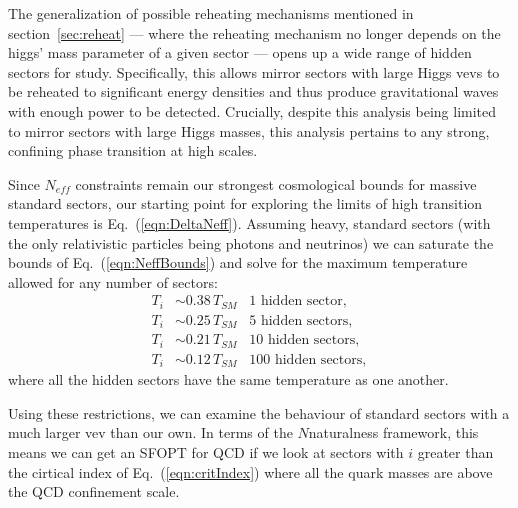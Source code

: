 \documentclass[nofootinbib,twocolumn,preprintnumbers]{revtex4-1}
\begin{document}
The generalization of possible reheating mechanisms mentioned in section~\ref{sec:reheat} --- where the reheating mechanism no longer depends on the higgs' mass parameter of a given sector --- opens up a wide range of hidden sectors for study. Specifically, this allows mirror sectors with large Higgs vevs to be reheated to significant energy densities and thus produce gravitational waves with enough power to be detected. Crucially, despite this analysis being limited to mirror sectors with large Higgs masses, this analysis pertains to any strong, confining phase transition at high scales.

Since $N_{eff}$ constraints remain our strongest cosmological bounds for massive standard sectors, our starting point for exploring the limits of high transition temperatures is Eq.~(\ref{eqn:DeltaNeff}). Assuming heavy, standard sectors (with the only relativistic particles being photons and neutrinos) we can saturate the bounds of Eq.~(\ref{eqn:NeffBounds}) and solve for the maximum temperature allowed for any number of sectors:
\begin{equation}\label{eqn:energyDensityAllowed}
\begin{split}
T_i &\sim 0.38 \,T_{SM} \,\,\,\,\, \mathrm{1}\,\, \mathrm{hidden}\,\, \mathrm{sector},
\\
T_i &\sim 0.25 \,T_{SM} \,\,\,\,\, \mathrm{5} \,\,\mathrm{hidden}\,\, \mathrm{sectors},
\\
T_i &\sim 0.21 \,T_{SM} \,\,\,\,\, \mathrm{10} \,\,\mathrm{hidden}\,\, \mathrm{sectors},
\\
T_i &\sim 0.12 \,T_{SM} \,\,\,\,\, \mathrm{100} \,\,\mathrm{hidden}\,\, \mathrm{sectors},
\end{split}
\end{equation}
where all the hidden sectors have the same temperature as one another.

Using these restrictions, we can examine the behaviour of standard sectors with a much larger vev than our own. In terms of the $N$naturalness framework, this means we can get an SFOPT for QCD if we look at sectors with $i$ greater than the cirtical index of Eq.~(\ref{eqn:critIndex}) where all the quark masses are above the QCD confinement scale. 

\end{document}
